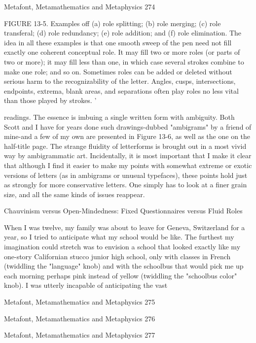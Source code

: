 Metafont, Metamathematics and Metaphysics                                                 274

FIGURE 13-5. Examples off (a) role splitting; (b) role merging; (c) role transferal; (d)
role redundancy; (e) role addition; and (f) role elimination. The idea in all these
examples is that one smooth sweep of the pen need not fill exactly one coherent
conceptual role. It may fill two or more roles (or parts of two or more); it may fill less
than one, in which case several strokes combine to make one role; and so on. Sometimes
roles can be added or deleted without serious harm to the recognizability of the letter.
Angles, cusps, intersections, endpoints, extrema, blank areas, and separations often play
roles no less vital than those played by strokes. '

readings. The essence is imbuing a single written form with ambiguity. Both Scott and I
have for years done such drawings-dubbed "ambigrams" by a friend of mine-and a few of
my own are presented in Figure 13-6, as well as the one on the half-title page. The
strange fluidity of letterforms is brought out in a most vivid way by ambigrammatic art.
       Incidentally, it is most important that I make it clear that although I find it easier
to make my points with somewhat extreme or exotic versions of letters (as in ambigrams
or unusual typefaces), these points hold just as strongly for more conservative letters.
One simply has to look at a finer grain size, and all the same kinds of issues reappear.

                     Chauvinism versus Open-Mindedness:
                        Fixed Questionnaires versus Fluid Roles

        When I was twelve, my family was about to leave for Geneva, Switzerland for a
year, so I tried to anticipate what my school would be like. The furthest my imagination
could stretch was to envision a school that looked exactly like my one-story Californian
stucco junior high school, only with classes in French (twiddling the "language" knob)
and with the schoolbus that would pick me up each morning perhaps pink instead of
yellow (twiddling the "schoolbus color" knob). I was utterly incapable of anticipating the
vast




Metafont, Metamathematics and Metaphysics                                                275

Metafont, Metamathematics and Metaphysics   276

Metafont, Metamathematics and Metaphysics   277

